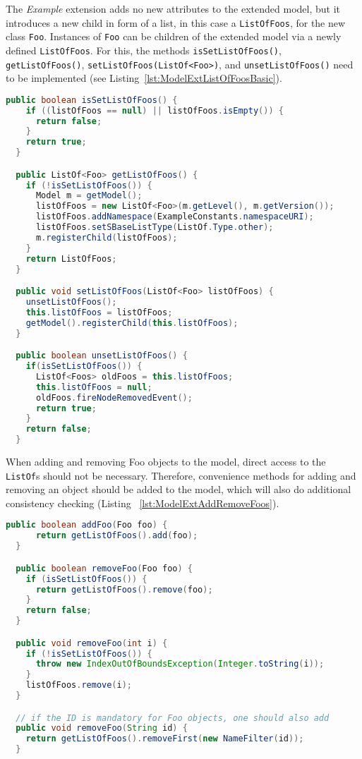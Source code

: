 The \emph{Example} extension adds no new attributes to the extended model,
but it introduces a new child in form of a list, in this case a \texttt{ListOfFoos},
for the new class \texttt{Foo}.
Instances of \texttt{Foo} can be children of the extended model via a newly
defined \texttt{ListOfFoos}. For this, the methods \texttt{isSetListOfFoos()},
\texttt{getListOfFoos()}, \texttt{setListOfFoos(ListOf<Foo>)}, and
\texttt{unsetListOfFoos()} need to be implemented (see
Listing~\vref{lst:ModelExtListOfFoosBasic}).

\begin{lstlisting}[language=Java,caption={Implementation of the \texttt{ListOf}
methods: \texttt{isSetListOfFoos()}, \texttt{getListOfFoos()}, 
\texttt{setListOfFoos()}},label={lst:ModelExtListOfFoosBasic}]
  public boolean isSetListOfFoos() {
    if ((listOfFoos == null) || listOfFoos.isEmpty()) {
      return false;
    }
    return true;
  }

  public ListOf<Foo> getListOfFoos() {
    if (!isSetListOfFoos()) {
      Model m = getModel();
      listOfFoos = new ListOf<Foo>(m.getLevel(), m.getVersion());
      listOfFoos.addNamespace(ExampleConstants.namespaceURI);
      listOfFoos.setSBaseListType(ListOf.Type.other);
      m.registerChild(listOfFoos);
    }
    return ListOfFoos;
  }

  public void setListOfFoos(ListOf<Foo> listOfFoos) {
    unsetListOfFoos();
    this.listOfFoos = listOfFoos;
    getModel().registerChild(this.listOfFoos);
  }

  public boolean unsetListOfFoos() {
    if(isSetListOfFoos()) {
      ListOf<Foos> oldFoos = this.listOfFoos;
      this.listOfFoos = null;
      oldFoos.fireNodeRemovedEvent();
      return true;
    }
    return false;
  }
\end{lstlisting}

When adding and removing Foo objects to the model, direct access to the
\texttt{ListOf}s should not be necessary. Therefore, convenience methods for
adding and removing an object should be added to the model, which will also do
additional consistency checking (Listing ~\vref{lst:ModelExtAddRemoveFoos}).

\begin{lstlisting}[language=Java,caption={Implementation of \texttt{ListOf} methods \texttt{addFoo(Foo foo)}, \texttt{removeFoo(Foo foo)}, \texttt{removeFoo(int i)}},label={lst:ModelExtAddRemoveFoos}]
  public boolean addFoo(Foo foo) {
      return getListOfFoos().add(foo);
  }

  public boolean removeFoo(Foo foo) {
    if (isSetListOfFoos()) {
      return getListOfFoos().remove(foo);
    }
    return false;
  }

  public void removeFoo(int i) {
    if (!isSetListOfFoos()) {
      throw new IndexOutOfBoundsException(Integer.toString(i));
    }
    listOfFoos.remove(i);
  }

  // if the ID is mandatory for Foo objects, one should also add
  public void removeFoo(String id) {
    return getListOfFoos().removeFirst(new NameFilter(id));
  }
\end{lstlisting}

